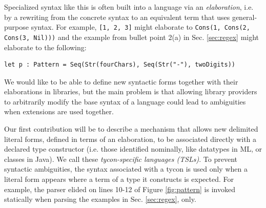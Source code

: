 Specialized syntax like this is often built into a language via an \emph{elaboration}, i.e. by a rewriting from the concrete syntax to an equivalent term that uses general-purpose syntax. For example, \verb|[1, 2, 3]| might elaborate to \verb|Cons(1, Cons(2, Cons(3, Nil)))| and the example from bullet point 2(a) in Sec. \ref{sec:regex} might elaborate to the following:

\begin{lstlisting}[numbers=none]
let p : Pattern = Seq(Str(fourChars), Seq(Str("-"), twoDigits))
\end{lstlisting}

We would like to be able to define new syntactic forms together with their elaborations in libraries, but the main problem is that allowing library providers to arbitrarily modify the base syntax of a language could lead to ambiguities when extensions are used together.

\begin{contribution}\label{cont:TSLs}
Our first contribution will be to describe  a mechanism that allows new delimited literal forms, defined  in terms of an  elaboration, to  be associated directly with a declared type constructor (i.e. those identified nominally, like datatypes in ML, or classes in Java). We call these \emph{tycon-specific languages (TSLs)}. 
To prevent syntactic ambiguities, the syntax associated with a tycon is used only when a literal form appears where a term of a type it constructs is expected. For example, the parser elided on lines 10-12 of Figure \ref{fig:pattern} is invoked statically when parsing the examples in Sec. \ref{sec:regex}, only.
\end{contribution}


